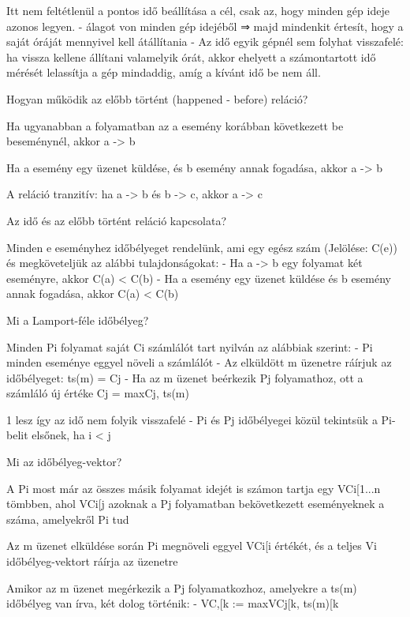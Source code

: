 \documentclass[12pt]{article}
\begin{document}
\begin{description}[style=unboxed]
    \item Itt nem feltétlenül a pontos idő beállítása a cél, csak az, hogy minden gép ideje azonos legyen.
        - álagot von minden gép idejéből
        ⇒ majd mindenkit értesít, hogy a saját óráját mennyivel kell átállítania
        - Az idő egyik gépnél sem folyhat visszafelé: ha vissza kellene állítani valamelyik órát,
        akkor ehelyett a számontartott idő mérését lelassítja a gép mindaddig, amíg a kívánt idő be nem áll.
    \item  Hogyan működik az előbb történt (happened - before) reláció?
    \item Ha ugyanabban a folyamatban az a esemény korábban következett be beseménynél, akkor a -> b
    \item Ha a esemény egy üzenet küldése, és b esemény annak fogadása, akkor a -> b
    \item A reláció tranzitív:  ha a -> b és b -> c, akkor a -> c
    \item  Az idő és az előbb történt reláció kapcsolata?
    \item Minden e eseményhez időbélyeget rendelünk, ami egy egész szám (Jelölése:  C(e)) és megköveteljük az alábbi tulajdonságokat:
        - Ha a -> b egy folyamat két eseményre, akkor C(a) < C(b)
        - Ha a esemény egy üzenet küldése és b esemény annak fogadása, akkor C(a) < C(b)
    \item  Mi a Lamport-féle időbélyeg?
    \item Minden Pi folyamat saját Ci számlálót tart nyilván az alábbiak szerint: 
        - Pi minden eseménye eggyel növeli a számlálót
        - Az elküldött m üzenetre ráírjuk az időbélyeget: ts(m) = Cj
        - Ha az m üzenet beérkezik Pj folyamathoz, ott a számláló új értéke Cj = max{Cj, ts(m)}\item1 lesz így az idő nem folyik visszafelé
        - Pi és Pj időbélyegei közül tekintsük a Pi-belit elsőnek, ha i < j
    \item  Mi az időbélyeg-vektor?
    \item A Pi most már az összes másik folyamat idejét is számon tartja egy VCi[1...n tömbben,
        ahol VCi[j azoknak a Pj folyamatban bekövetkezett eseményeknek a száma, amelyekről Pi tud
    \item Az m üzenet elküldése során Pi megnöveli eggyel  VCi[i értékét, és a teljes Vi időbélyeg-vektort ráírja az üzenetre
    \item Amikor az m üzenet megérkezik a Pj folyamatkozhoz, amelyekre a ts(m) időbélyeg van írva, két dolog történik:
        - VC,[k := max{VCj[k, ts(m)[k}

\end{description}
\end{document}
